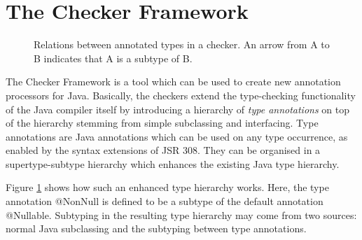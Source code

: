 \documentclass{pracamgr}
\begin{document}
\section{The Checker Framework}
\label{sec:framework}

\begin{figure}
  \centering
  
  \caption{Relations between annotated types in a checker. An arrow from
    A to B indicates that A is a subtype of B.}
  \label{fig:example-checker-hierarchy}
\end{figure}

The Checker Framework is a tool which can be used to create new
annotation processors for Java. Basically, the checkers extend the
type-checking functionality of the Java compiler itself by introducing
a hierarchy of \emph{type annotations} on top of the hierarchy
stemming from simple subclassing and interfacing. Type annotations are
Java annotations which can be used on any type occurrence, as enabled
by the syntax extensions of JSR 308. They can be organised in a
supertype-subtype hierarchy which enhances the existing Java type
hierarchy.

Figure \ref{fig:example-checker-hierarchy} shows how such an enhanced
type hierarchy works. Here, the type annotation @NonNull is defined to
be a subtype of the default annotation @Nullable. Subtyping in the
resulting type hierarchy may come from two sources: normal Java
subclassing and the subtyping between type annotations.
\end{document}
